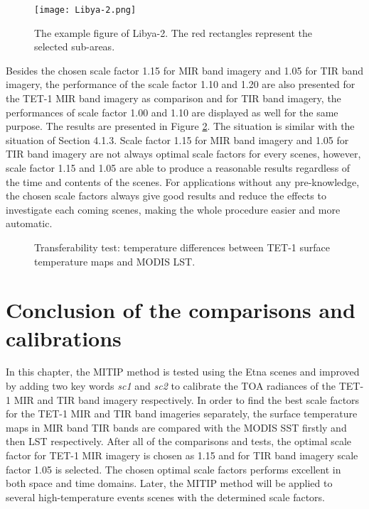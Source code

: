 \begin{figure}[!htbp]
\centering
\texttt{[image: Libya-2.png]}
\caption{The example figure of Libya-2. The red rectangles represent the selected sub-areas.}
\label{fig:Libya2_sub_areas}
\end{figure}

\noindent Besides the chosen scale factor 1.15 for MIR band imagery and 1.05 for TIR band imagery, the performance of the scale factor 1.10 and 1.20 are also presented for the TET-1 MIR band imagery as comparison and for TIR band imagery, the performances of scale factor 1.00 and 1.10 are displayed as well for the same purpose. The results are presented in Figure \ref{fig:LST_test}. The situation is similar with the situation of Section 4.1.3. Scale factor 1.15 for MIR band imagery and 1.05 for TIR band imagery are not always optimal scale factors for every scenes, however, scale factor 1.15 and 1.05 are able to produce a reasonable results regardless of the time and contents of the scenes. For applications without any pre-knowledge, the chosen scale factors always give good results and reduce the effects to investigate each coming scenes, making the whole procedure easier and more automatic.\\

\begin{figure}[!htbp]
\centering
{}
\hspace{0.5in}
\caption{Transferability test: temperature differences between TET-1 surface temperature maps and MODIS LST.}
\label{fig:LST_test}
\end{figure}


\section{Conclusion of the comparisons and calibrations}
In this chapter, the MITIP method is tested using the Etna scenes and improved by adding two key words \emph{sc1} and \emph{sc2} to calibrate the TOA radiances of the TET-1 MIR and TIR band imagery respectively. In order to find the best scale factors for the TET-1 MIR and TIR band imageries separately, the surface temperature maps in MIR band TIR bands are compared with the MODIS SST firstly and then LST respectively. After all of the comparisons and tests, the optimal scale factor for TET-1 MIR imagery is chosen as 1.15 and for TIR band imagery scale factor 1.05 is selected. The chosen optimal scale factors performs excellent in both space and time domains. Later, the MITIP method will be applied to several high-temperature events scenes with the determined scale factors.\\